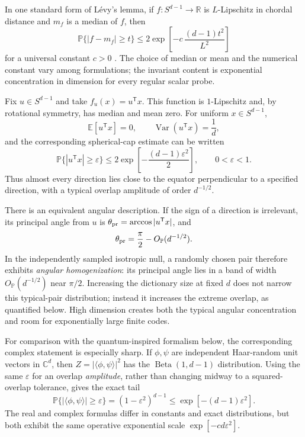 \documentclass[
  aps,
  reprint,
  superscriptaddress,
  floatfix,
  nofootinbib,
  longbibliography
]{revtex4-2}
\newcommand{\R}{\mathbb{R}}
\newcommand{\E}{\mathbb{E}}
\newcommand{\Prob}{\mathbb{P}}
\newcommand{\Sph}[1]{S^{#1}}
\newcommand{\T}{^{\mathsf{T}}}
\DeclareMathOperator{\Var}{Var}
\begin{document}
In one standard form of L\'evy's lemma, if
$f:\Sph{d-1}\rightarrow\R$ is $L$-Lipschitz in chordal distance and $m_f$ is
a median of $f$, then
\begin{equation}
\label{eq:levy-general}
\Prob\{|f-m_f|\geq t\}
\leq
2\exp\!\left[-c\,\frac{(d-1)t^2}{L^2}\right]
\end{equation}
for a universal constant $c>0$
\cite{ledoux2001concentration,milman1986asymptotic}.  The choice of median or
mean and the numerical constant vary among formulations; the invariant
content is exponential concentration in dimension for every regular scalar
probe.

Fix $u\in\Sph{d-1}$ and take $f_u(x)=u\T x$.  This function is
$1$-Lipschitz and, by rotational symmetry, has median and mean zero.  For
uniform $x\in\Sph{d-1}$,
\begin{equation}
\label{eq:moments}
\E[u\T x]=0,
\qquad
\Var(u\T x)=\frac{1}{d},
\end{equation}
and the corresponding spherical-cap estimate can be written
\begin{equation}
\label{eq:overlap}
\Prob\{|u\T x|\geq\varepsilon\}
\leq
2\exp\!\left[-\frac{(d-1)\varepsilon^2}{2}\right],
\qquad 0<\varepsilon<1.
\end{equation}
Thus almost every direction lies close to the equator perpendicular to a
specified direction, with a typical overlap amplitude of order
$d^{-1/2}$.

There is an equivalent angular description.  If the sign of a direction is
irrelevant, its principal angle from $u$ is
$\theta_{\rm pr}=\arccos|u\T x|$, and
\begin{equation}
\label{eq:angular-homogenization}
\theta_{\rm pr}
=\frac{\pi}{2}-O_{\Prob}(d^{-1/2}).
\end{equation}
In the independently sampled isotropic null, a randomly chosen pair therefore
exhibits \emph{angular homogenization}: its principal angle lies in a band of
width $O_{\Prob}(d^{-1/2})$ near $\pi/2$.  Increasing the dictionary size at
fixed $d$ does not narrow this typical-pair distribution; instead it increases
the extreme overlap, as quantified below.  High dimension creates both the
typical angular concentration and room for exponentially large finite codes.

For comparison with the quantum-inspired formalism below, the corresponding
complex statement is especially sharp.  If $\phi,\psi$ are independent
Haar-random unit vectors in $\mathbb C^d$, then
$Z=|\langle\phi,\psi\rangle|^2$ has the
$\operatorname{Beta}(1,d-1)$ distribution.  Using the same
$\varepsilon$ for an overlap \emph{amplitude}, rather than changing midway to
a squared-overlap tolerance, gives the exact tail
\begin{equation}
\label{eq:complex-haar-tail}
\Prob\{|\langle\phi,\psi\rangle|\geq\varepsilon\}
=(1-\varepsilon^2)^{d-1}
\leq
\exp[-(d-1)\varepsilon^2].
\end{equation}
The real and complex formulas differ in constants and exact distributions,
but both exhibit the same operative exponential scale
$\exp[-c d\varepsilon^2]$.
\end{document}
